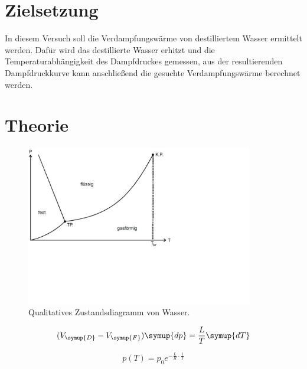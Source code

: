\section{Zielsetzung}
\label{sec:Zielsetzung}

In diesem Versuch soll die Verdampfungswärme von destilliertem Wasser ermittelt werden.
Dafür wird das destillierte Wasser erhitzt und die Temperaturabhängigkeit des Dampfdruckes gemessen, 
aus der resultierenden Dampfdruckkurve kann anschließend die gesuchte Verdampfungswärme berechnet werden.

\section{Theorie}
\label{sec:Theorie}

\begin{figure}
    \centering
    \includegraphics[height=7cm]{content/Bilder/Zustandsdiagramm.pdf}
    \caption{Qualitatives Zustandsdiagramm von Wasser. \cite{v203}}
    \label{fig:Zustandsdiagramm}
\end{figure}

\begin{equation}
    (V_{\symup{D}}-V_{\symup{F}})\symup{dp}=\frac{L}{T}\symup{dT}
    \label{eq:Clausius-Clapeyronsche Gleichung}
\end{equation}

\begin{equation}
    p(T)=p_0e^{-\frac{L}{R}\cdot\frac{1}{T}}
    \label{eq:Druck}
\end{equation}